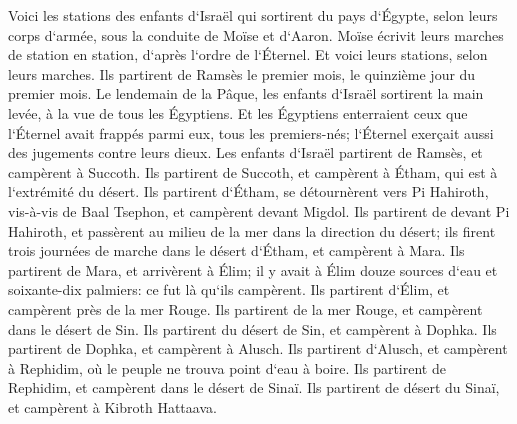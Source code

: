 \verse Voici les stations des enfants d`Israël qui sortirent du pays d`Égypte, selon leurs corps d`armée, sous la conduite de Moïse et d`Aaron. 
\verse Moïse écrivit leurs marches de station en station, d`après l`ordre de l`Éternel. Et voici leurs stations, selon leurs marches. 
\verse Ils partirent de Ramsès le premier mois, le quinzième jour du premier mois. Le lendemain de la Pâque, les enfants d`Israël sortirent la main levée, à la vue de tous les Égyptiens. 
\verse Et les Égyptiens enterraient ceux que l`Éternel avait frappés parmi eux, tous les premiers-nés; l`Éternel exerçait aussi des jugements contre leurs dieux. 
\verse Les enfants d`Israël partirent de Ramsès, et campèrent à Succoth. 
\verse Ils partirent de Succoth, et campèrent à Étham, qui est à l`extrémité du désert. 
\verse Ils partirent d`Étham, se détournèrent vers Pi Hahiroth, vis-à-vis de Baal Tsephon, et campèrent devant Migdol. 
\verse Ils partirent de devant Pi Hahiroth, et passèrent au milieu de la mer dans la direction du désert; ils firent trois journées de marche dans le désert d`Étham, et campèrent à Mara. 
\verse Ils partirent de Mara, et arrivèrent à Élim; il y avait à Élim douze sources d`eau et soixante-dix palmiers: ce fut là qu`ils campèrent. 
\verse Ils partirent d`Élim, et campèrent près de la mer Rouge. 
\verse Ils partirent de la mer Rouge, et campèrent dans le désert de Sin. 
\verse Ils partirent du désert de Sin, et campèrent à Dophka. 
\verse Ils partirent de Dophka, et campèrent à Alusch. 
\verse Ils partirent d`Alusch, et campèrent à Rephidim, où le peuple ne trouva point d`eau à boire. 
\verse Ils partirent de Rephidim, et campèrent dans le désert de Sinaï. 
\verse Ils partirent de désert du Sinaï, et campèrent à Kibroth Hattaava. 
